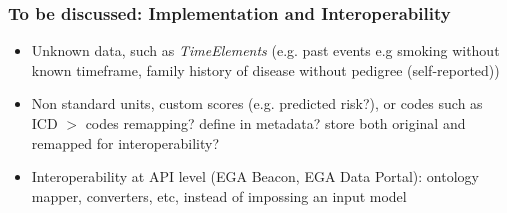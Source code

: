 \documentclass{beamer}
\begin{document}
\begin{frame}
\frametitle{To be discussed: Implementation and Interoperability}
\begin{itemize}

\item Unknown data, such as \textit{TimeElements} (e.g. past events e.g smoking without known timeframe, family history of disease without pedigree (self-reported))
\item Non standard units, custom scores (e.g. predicted risk?), or codes such as ICD $>$ codes remapping? define in metadata? store both original and remapped for interoperability?
\item Interoperability at API level (EGA Beacon, EGA Data Portal): ontology mapper, converters, etc, instead of impossing an input model
\end{itemize}
\end{frame}





\end{document}
